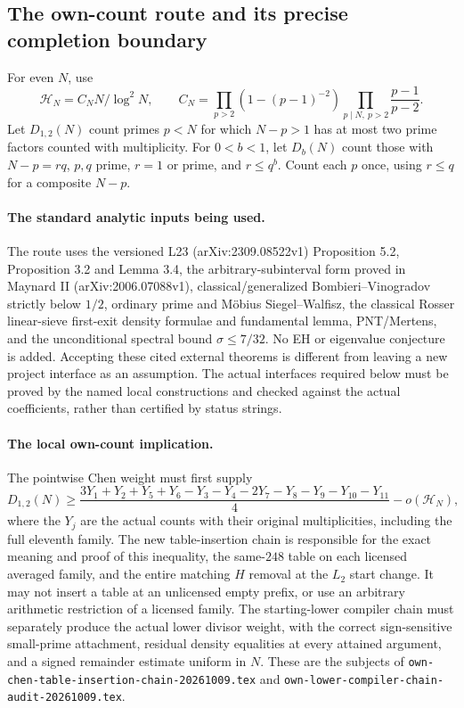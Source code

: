 \subsection{The own-count route and its precise completion boundary}

For even $N$, use
\[
 \mathcal H_N=C_NN/\log^2N,\qquad
 C_N=\prod_{p>2}(1-(p-1)^{-2})
       \prod_{p\mid N,\ p>2}\frac{p-1}{p-2}.
\]
Let $D_{1,2}(N)$ count primes $p<N$ for which $N-p>1$ has at most
two prime factors counted with multiplicity.  For $0<b<1$, let
$D_b(N)$ count those with $N-p=rq$, $p,q$ prime, $r=1$ or prime,
and $r\le q^b$.  Count each $p$ once, using $r\le q$ for a
composite $N-p$.

\paragraph{The standard analytic inputs being used.}
The route uses the versioned L23 (arXiv:2309.08522v1) Proposition 5.2,
Proposition 3.2 and Lemma 3.4, the arbitrary-subinterval form proved
in Maynard II (arXiv:2006.07088v1), classical/generalized
Bombieri--Vinogradov strictly below $1/2$, ordinary prime and
M\"obius Siegel--Walfisz, the classical Rosser linear-sieve
first-exit density formulae and fundamental lemma, PNT/Mertens,
and the unconditional spectral bound $\sigma\le7/32$.
No EH or eigenvalue conjecture is added.  Accepting these cited
external theorems is different from leaving a new project interface
as an assumption.  The actual interfaces required below must be
proved by the named local constructions and checked against the
actual coefficients, rather than certified by status strings.

\paragraph{The local own-count implication.}
The pointwise Chen weight must first supply
\[
 D_{1,2}(N)\ge
 \frac{3Y_1+Y_2+Y_5+Y_6-Y_3-Y_4-2Y_7-Y_8-Y_9-Y_{10}-Y_{11}}4
 -o(\mathcal H_N),
\]
where the $Y_j$ are the actual counts with their original
multiplicities, including the full eleventh family.
The new table-insertion chain is responsible for the exact meaning
and proof of this inequality, the same-$248$ table on each licensed
averaged family, and the entire matching $H$ removal at the $L_2$
start change.  It may not insert a table at an unlicensed empty
prefix, or use an arbitrary arithmetic restriction of a licensed
family.  The starting-lower compiler chain must separately produce
the actual lower divisor weight, with the correct sign-sensitive
small-prime attachment, residual density equalities at every
attained argument, and a signed remainder estimate uniform in $N$.
These are the subjects of
\texttt{own-chen-table-insertion-chain-20261009.tex} and
\texttt{own-lower-compiler-chain-audit-20261009.tex}.

